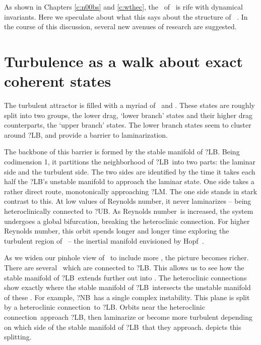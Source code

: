 
As shown in Chapters \ref{c:n00bs} and \ref{c:wthec}, the
\statesp\ of \KS\ is rife with dynamical invariants.
Here we speculate about what this says about the
structure of \KS\ \statesp.  In the course of this
discussion, several new avenues of research are suggested.

\section{Turbulence as a walk about exact coherent states}
The turbulent attractor is filled with a myriad of \eqva\ and \reqva.
These states are roughly split into two groups, the lower drag, `lower branch'
states and their higher drag counterparts, the `upper branch' states.
The lower branch states seem to cluster around ?LB, and provide
a barrier to laminarization.

The backbone of this barrier is formed by the
stable manifold of ?LB.  Being codimension 1, it partitions the
neighborhood of ?LB\ into two parts: the laminar side and
the turbulent side.  The two sides are identified by the time it takes
each half the ?LB's unstable manifold to approach the laminar state.
One side takes a rather direct route, monotonically approaching ?LM.
The one side stands in stark contrast to this.  At low values of Reynolds number,
it never laminarizes -- being heteroclinically connected to ?UB.
As
Reynolds number\ is increased, the system undergoes a global bifurcation,
breaking the heteroclinic connection.  For higher Reynolds number, this orbit spends longer
and longer time exploring the turbulent region of \statesp\ -- the inertial manifold
envisioned by Hopf~\cite{Hopf48}.

As we widen our pinhole view of \statesp\ to include more \eqva, the picture
becomes richer.  There are several \eqva\ which are connected to ?LB.  This
allows us to see how the stable manifold of ?LB\ extends further out into \statesp.  The heteroclinic connections
show exactly where the stable manifold of ?LB\ intersects the unstable manifold
of these \eqva.  For example, ?NB\ has a single complex instability.  This plane is split
by a heteroclinic connection\ to ?LB.
Orbits near the heteroclinic connection\ approach ?LB, then laminarize or become
more turbulent depending on which side of the stable manifold
of ?LB\ that they approach.
 depicts this splitting.


